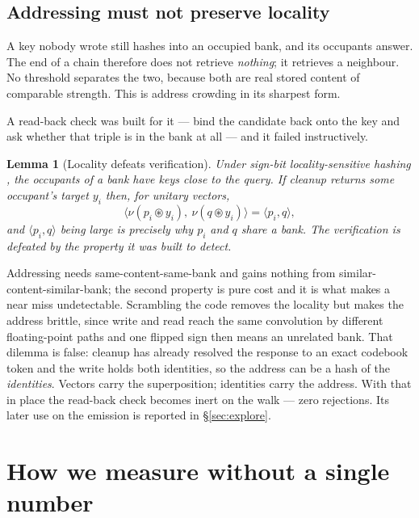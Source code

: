 \documentclass[11pt,a4paper]{article}
\newcommand{\bind}{\mathbin{\circledast}}
\newcommand{\nrm}[1]{\nu\!\left(#1\right)}
\theoremstyle{plain}
\newtheorem{lemma}{Lemma}
\theoremstyle{definition}
\theoremstyle{remark}
\begin{document}
\subsection{Addressing must not preserve locality}
\label{sec:addressing}

A key nobody wrote still hashes into an occupied bank, and its occupants answer.
The end of a chain therefore does not retrieve \emph{nothing}; it retrieves a
neighbour. No threshold separates the two, because both are real stored content
of comparable strength. This is address crowding \citep{yang_2026_22161096} in
its sharpest form.

A read-back check was built for it --- bind the candidate back onto the key and
ask whether that triple is in the bank at all --- and it failed instructively.

\begin{lemma}[Locality defeats verification]
\label{lem:lsh}
Under sign-bit locality-sensitive hashing
\citep{indyk1998approximate,charikar2002similarity}, the occupants of a bank
have keys close to the query. If cleanup returns some occupant's target $y_i$
then, for unitary vectors,
\[
\big\langle \nrm{p_i\bind y_i},\ \nrm{q\bind y_i}\big\rangle=\langle p_i,q\rangle,
\]
and $\langle p_i,q\rangle$ being large is \emph{precisely why} $p_i$ and $q$
share a bank. The verification is defeated by the property it was built to
detect.
\end{lemma}

Addressing needs same-content-same-bank and gains nothing from
similar-content-similar-bank; the second property is pure cost and it is what
makes a near miss undetectable. Scrambling the code removes the locality but
makes the address brittle, since write and read reach the same convolution by
different floating-point paths and one flipped sign then means an unrelated
bank. That dilemma is false: cleanup has already resolved the response to an
exact codebook token and the write holds both identities, so the address can be
a hash of the \emph{identities}. Vectors carry the superposition; identities
carry the address. With that in place the read-back check becomes inert on the
walk --- zero rejections. Its later use on the emission is reported in
\S\ref{sec:explore}.

\section{How we measure without a single number}
\label{sec:measure}
\end{document}
